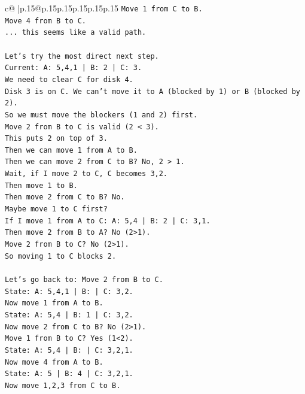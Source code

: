 \documentclass{article}
\begin{document}
{\begin{supertabular}{c@{$\;$}|p{.15\linewidth}@{}p{.15\linewidth}p{.15\linewidth}p{.15\linewidth}p{.15\linewidth}p{.15\linewidth}}
{{{\texttt{Move 1 from C to B.} \\
\texttt{Move 4 from B to C.} \\
\texttt{... this seems like a valid path.} \\
\\ 
\texttt{Let's try the most direct next step.} \\
\texttt{Current: A: 5,4,1 | B: 2 | C: 3.} \\
\texttt{We need to clear C for disk 4.} \\
\texttt{Disk 3 is on C. We can't move it to A (blocked by 1) or B (blocked by 2).} \\
\texttt{So we must move the blockers (1 and 2) first.} \\
\texttt{Move 2 from B to C is valid (2 < 3).} \\
\texttt{This puts 2 on top of 3.} \\
\texttt{Then we can move 1 from A to B.} \\
\texttt{Then we can move 2 from C to B? No, 2 > 1.} \\
\texttt{Wait, if I move 2 to C, C becomes 3,2.} \\
\texttt{Then move 1 to B.} \\
\texttt{Then move 2 from C to B? No.} \\
\texttt{Maybe move 1 to C first?} \\
\texttt{If I move 1 from A to C: A: 5,4 | B: 2 | C: 3,1.} \\
\texttt{Then move 2 from B to A? No (2>1).} \\
\texttt{Move 2 from B to C? No (2>1).} \\
\texttt{So moving 1 to C blocks 2.} \\
\\ 
\texttt{Let's go back to: Move 2 from B to C.} \\
\texttt{State: A: 5,4,1 | B: | C: 3,2.} \\
\texttt{Now move 1 from A to B.} \\
\texttt{State: A: 5,4 | B: 1 | C: 3,2.} \\
\texttt{Now move 2 from C to B? No (2>1).} \\
\texttt{Move 1 from B to C? Yes (1<2).} \\
\texttt{State: A: 5,4 | B: | C: 3,2,1.} \\
\texttt{Now move 4 from A to B.} \\
\texttt{State: A: 5 | B: 4 | C: 3,2,1.} \\
\texttt{Now move 1,2,3 from C to B.} \\
}}}
\end{supertabular}}
\end{document}
